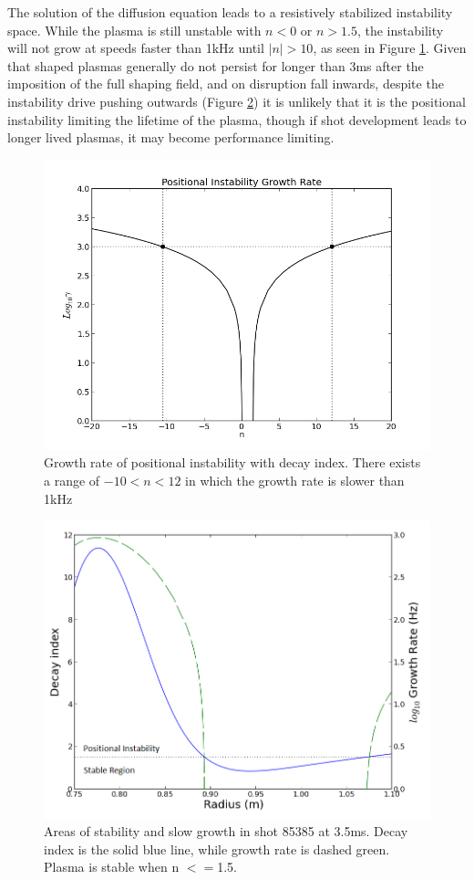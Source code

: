 \documentclass[aps,prl,twocolumn,superscriptaddress,groupedaddress]{revtex4}  %
\begin{document}
	The solution of the diffusion equation leads to a resistively stabilized instability space.  While the plasma is still unstable with $n < 0$ or $n > 1.5$, the instability will not grow at speeds faster than 1kHz until $|n| > 10$, as seen in Figure \ref{decay_index_stabilization}.  Given that shaped plasmas generally do not persist for longer than 3ms after the imposition of the full shaping field, and on disruption fall inwards, despite the instability drive pushing outwards (Figure \ref{decay_index_and growth}) it is unlikely that it is the positional instability limiting the lifetime of the plasma, though if shot development leads to longer lived plasmas, it may become performance limiting.
\begin{figure}[htb]
\centering
\includegraphics[scale=.45]{../Plots/Decay_growth_narrow.png}\caption{Growth rate of positional instability with decay index.  There exists a range of $-10 < n < 12$ in which the growth rate is slower than 1kHz}
\label{decay_index_stabilization}
\end{figure}
\begin{figure}[htb]
\centering
\includegraphics[scale=.375]{../Plots/Decay_stability_and_growth_on_midplane-edit.png}\caption{Areas of stability and slow growth in shot 85385 at 3.5ms. Decay index is the solid blue line, while growth rate is dashed green. Plasma is stable when n $<=$1.5.}
\label{decay_index_and growth}
\end{figure}
\end{document}
